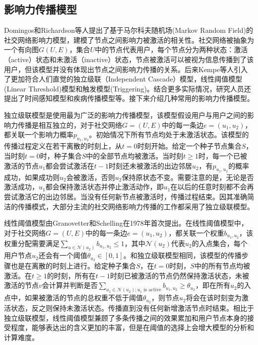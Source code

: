 \subsection{影响力传播模型}

Domingos和Richardson等人\cite{domingos2001mining}提出了基于马尔科夫随机场(Markov Random Field)的社交网络影响力模型，建模了节点之间影响力被激活的相关性。社交网络被抽象为一个有向图$G(U,E)$，集合$U$中的节点代表用户，每个节点分为两种状态：激活（active）状态和未激活（inactive）状态，节点被激活可以被视为信息传播到了该用户，但该模型并没有体现出节点之间影响力传播的关系。后来Kempe等人\cite{kempe2003maximizing}引入了更加符合人们直觉的独立级联（Independent Cascade）模型，线性阈值模型(Linear Threshold)模型和触发模型(Triggering)。结合更多实际情况，研究人员还提出了时间感知模型\cite{chen2012time}和疾病传播模型\cite{shah2010detecting}等。接下来介绍几种常用的影响力传播模型。

独立级联模型是使用最为广泛的影响力传播模型，该模型假设用户与用户之间的影响力传播是相互独立的，对于社交网络$G=(U,E)$中的每一条边$e=(u_1,u_2)$，都关联一个影响力概率$p_{u_1,u_2}$。初始情况下所有节点均处于未激活状态。该模型的传播过程定义在若干离散的时刻上，从$t=0$时刻开始。给定一个种子节点集合$S$，当时刻$t=0$时，种子集合$S$中的全部节点均被激活。当时刻$t \ge 1$时，每一个已被激活的节点$u_1$都会尝试激活在$t-1$时刻还未被激活的出边邻居$u_2$，有$p_{u_1,u_2}$的概率成功，如果成功则$u_2$会被激活，否则$u_2$保持原状态不变。需要注意的是，无论是否激活成功，$u_1$都会保持激活状态并停止激活动作，即$u_1$在以后的任意时刻都不会再尝试激活它的出边邻居。当没有任何新节点被激活时，传播过程结束。因其准确简洁的传播模式，大部分主流的社交网络影响力传播的工作都采用了独立级联模型。

线性阈值模型由Granovetter和Schelling在1978年首次提出\cite{granovetter1978threshold}。在线性阈值模型中，对于社交网络$G=(U,E)$中的每一条边$e=(u_1,u_2)$，都关联一个权重$b_{u_1,u_2}$，该权重分配需要满足$\sum_{u \in \mathcal{N}(u_2)}b_{u_1,u_2}\le1$，其中$\mathcal{N}(u_2)$代表$u_2$的入点集合，每个用户节点$u_2$还会有一个阈值$\theta_{u_2} \in [0,1]$。和独立级联模型相同，该模型的传播步骤也是在离散的时刻上进行。给定种子集合$S$，在$t=0$时刻，$S$中的所有节点均被激活。在$t\ge1$的时刻，所有在$t-1$时刻已被激活的节点仍然保持激活状态，未被激活的节点$v$会计算并判断是否$\sum_{u_1 \in \mathcal{N}(u_2);u_1 \text{ is  active}} b_{u_1,u_2} \ge \theta_{u_2}$，即在所有$u_2$的入点中，如果被激活的节点的总权重不低于阈值$\theta_{u_2}$，则节点$u_2$将会在该时刻变为激活状态，反之则保持未激活状态。传播直到没有任何新增激活节点时结束。相比于独立级联模型，线性阈值模型兼顾了多条传播之间的效果累加和用户节点本身的接受程度，能够表达出的含义更加的丰富，但是在阈值的选择上会增大模型的分析和计算难度\cite{chen2013information}。

